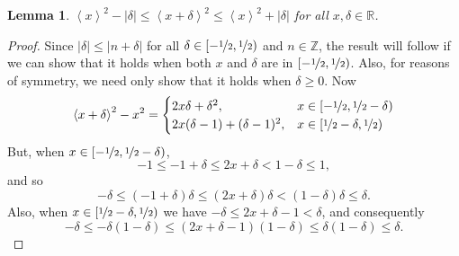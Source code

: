 \documentclass[aap,preprint]{imsart}
\newcommand{\reals}{{\mathbb R}}
\newcommand{\ints}{{\mathbb Z}}
\newcommand{\fracpart}[1]{\left\langle #1 \right\rangle}
\newcommand{\abs}[1]{\left\vert #1 \right\vert}
\newtheorem{lemma}{Lemma}
\begin{document}
\begin{lemma}\label{lem:boundedsquarefracparts}
$\fracpart{x}^2 - |\delta| \leq \fracpart{x + \delta}^2 \leq \fracpart{x}^2 + |\delta|$ for all $x, \delta \in \reals$.
\end{lemma}
\begin{proof}
Since $\abs{\delta} \leq \abs{n + \delta}$ for all $\delta \in [-\nicefrac{1}{2}, \nicefrac{1}{2})$ and $n \in \ints$, the result will follow if we can show that it holds when both $x$ and $\delta$ are in $[-\nicefrac{1}{2}, \nicefrac{1}{2})$.  Also, for reasons of symmetry, we need only show that it holds when $\delta \geq 0$.  Now
\[
\fracpart{x + \delta}^2 - x^2 = \begin{cases}
2x\delta + \delta^2, & x \in [-\nicefrac{1}{2}, \nicefrac{1}{2} - \delta) \\
2x(\delta-1) + (\delta-1)^2, & x \in [\nicefrac{1}{2} - \delta, \nicefrac{1}{2})
\end{cases}
\] 
But, when $x \in [-\nicefrac{1}{2}, \nicefrac{1}{2} - \delta)$, 
\[
-1 \leq -1 + \delta \leq 2x + \delta < 1 - \delta \leq 1,
\]
and so
\[
-\delta \leq (-1 + \delta)\delta \leq (2x + \delta)\delta < (1-\delta)\delta \leq \delta.
\]
Also, when $x \in [\nicefrac{1}{2} - \delta, \nicefrac{1}{2})$ we  have $-\delta \leq 2x + \delta - 1 < \delta$, and consequently
\[
-\delta \leq -\delta(1-\delta) \leq (2x + \delta - 1)(1 - \delta) \leq \delta(1 - \delta) \leq \delta.
\]


\end{proof}
\end{document}
